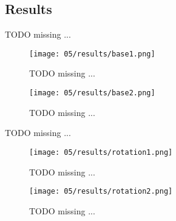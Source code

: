 
\subsection{Results}
    \colorbox{BurntOrange}{TODO missing ...} \\

    \begin{figure}[H]
      \centering
      \texttt{[image: 05/results/base1.png]}
      \caption{
        \colorbox{BurntOrange}{TODO missing ...}
      }
      \label{fig:SMT_results_base1}
    \end{figure}
    \begin{figure}[H]
      \centering
      \texttt{[image: 05/results/base2.png]}
      \caption{
        \colorbox{BurntOrange}{TODO missing ...}
      }
      \label{fig:SMT_results_base2}
    \end{figure}

    \colorbox{BurntOrange}{TODO missing ...} \\

    \begin{figure}[H]
      \centering
      \texttt{[image: 05/results/rotation1.png]}
      \caption{
        \colorbox{BurntOrange}{TODO missing ...}
      }
      \label{fig:SMT_results_rotation1}
    \end{figure}
    \begin{figure}[H]
      \centering
      \texttt{[image: 05/results/rotation2.png]}
      \caption{
        \colorbox{BurntOrange}{TODO missing ...}
      }
      \label{fig:SMT_results_rotation2}
    \end{figure}

